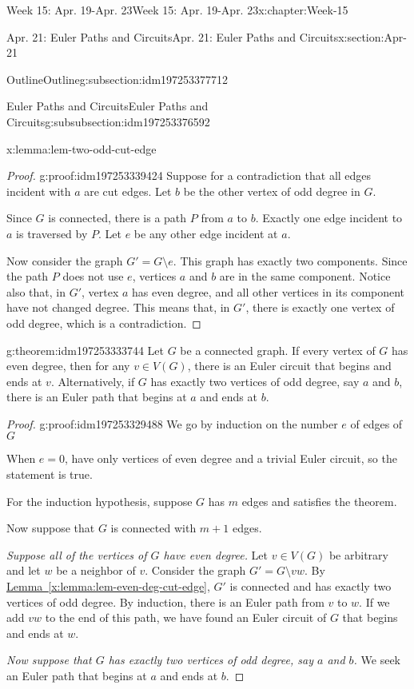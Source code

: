 \documentclass[oneside,10pt,]{book}
\newcommand{\xreffont}{\relax}
\numberwithin{equation}{section}
\begin{document}
\begin{chapterptx}{Week 15: Apr. 19-Apr. 23}{}{Week 15: Apr. 19-Apr. 23}{}{}{x:chapter:Week-15}
\begin{sectionptx}{Apr. 21: Euler Paths and Circuits}{}{Apr. 21: Euler Paths and Circuits}{}{}{x:section:Apr-21}
\begin{subsectionptx}{Outline}{}{Outline}{}{}{g:subsection:idm197253377712}
\begin{subsubsectionptx}{Euler Paths and Circuits}{}{Euler Paths and Circuits}{}{}{g:subsubsection:idm197253376592}
\begin{lemma}{}{}{x:lemma:lem-two-odd-cut-edge}
\end{lemma}
\begin{proof}{}{g:proof:idm197253339424}
Suppose for a contradiction that all edges incident with \(a\) are cut edges. Let \(b\) be the other vertex of odd degree in \(G\).%
\par
Since \(G\) is connected, there is a path \(P\) from \(a\) to \(b\). Exactly one edge incident to \(a\) is traversed by \(P\). Let \(e\) be any other edge incident at \(a\).%
\par
Now consider the graph \(G' = G\setminus e\). This graph has exactly two components. Since the path \(P\) does not use \(e\), vertices \(a\) and \(b\) are in the same component. Notice also that, in \(G'\), vertex \(a\) has even degree, and all other vertices in its component have not changed degree. This means that, in  \(G'\), there is exactly one vertex of odd degree, which is a contradiction.%
\end{proof}
\begin{theorem}{}{}{g:theorem:idm197253333744}%
Let \(G\) be a connected graph. If every vertex of \(G\) has even degree, then for any \(v\in V(G)\), there is an Euler circuit that begins and ends at \(v\). Alternatively, if \(G\) has exactly two vertices of odd degree, say \(a\) and \(b\), there is an Euler path that begins at \(a\) and ends at \(b\).%
\end{theorem}
\begin{proof}{}{g:proof:idm197253329488}
We go by induction on the number \(e\) of edges of \(G\)%
\par
When \(e=0\), have only vertices of even degree and a trivial Euler circuit, so the statement is true.%
\par
For the induction hypothesis, suppose \(G\) has \(m\) edges and satisfies the theorem.%
\par
Now suppose that \(G\) is connected with \(m+1\) edges.%
\par
\emph{Suppose all of the vertices of \(G\) have even degree.} Let \(v\in V(G)\) be arbitrary and let \(w\) be a neighbor of \(v\). Consider the graph \(G' = G\setminus vw\). By \hyperref[x:lemma:lem-even-deg-cut-edge]{Lemma~{\xreffont\ref{x:lemma:lem-even-deg-cut-edge}}}, \(G'\) is connected and has exactly two vertices of odd degree. By induction, there is an Euler path from \(v\) to \(w\). If we add \(vw\) to the end of this path, we have found an Euler circuit of \(G\) that begins and ends at \(w\).%
\par
\emph{Now suppose that \(G\) has exactly two vertices of odd degree, say \(a\) and \(b\).} We seek an Euler path that begins at \(a\) and ends at \(b\).%

\end{proof}
\end{subsubsectionptx}
\end{subsectionptx}
\end{sectionptx}
\end{chapterptx}
\end{document}
